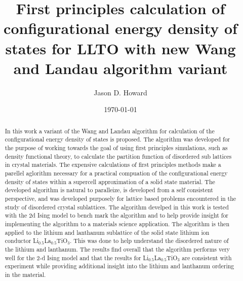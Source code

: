 \documentclass[aps,prl,reprint,superscriptaddress,showkeys]{revtex4-1}
\begin{document}
\title{First principles calculation of configurational energy density of states for LLTO with new Wang and Landau algorithm variant }

\author{Jason D. Howard}

\date{\today}

%


\begin{acknowledgments}
\end{acknowledgments}
\begin{abstract}
In this work  a variant of the Wang and Landau algorithm   for calculation of  the configurational energy density of states is proposed. The algorithm was developed for the purpose of working towards the goal of using first principles simulations, such as density functional theory, to calculate the partition function of disordered sub lattices in crystal materials. The expensive calculations of first principles methods make a parellel aglorithm necessary for a practical compuation of the configurational energy density of states within a supercell approximation of a solid state material. The developed algorithm is natural to paralleize, is developed from a self consistent perspective, and was developed purposely for lattice based problems encountered in the study of disordered crystal sublattices.  The algorithm develped in this work is tested with the 2d Ising model to bench mark the algorithm and to help provide insight for implementing the algorithm to a materials science application. The algorithm is then applied to the lithium and lanthanum sublattice of the solid state lithium ion conductor Li$_{0.5}$La$_{0.5}$TiO$_{3}$. This was done to help understand the disordered nature of the lithium and lanthanum. The results find overall that the algorithm performs very well for the 2-d Ising model and that the results for Li$_{0.5}$La$_{0.5}$TiO$_{3}$ are consistent with experiment while providing additional insight into the lithium and lanthanum ordering in the material. 
\end{abstract}
\maketitle
\end{document}
